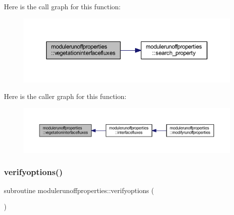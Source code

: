 Here is the call graph for this function\+:\nopagebreak
\begin{figure}[H]
\begin{center}
\leavevmode
\includegraphics[width=350pt]{namespacemodulerunoffproperties_ab3ab37be90febb6cff96da7ee7284955_cgraph}
\end{center}
\end{figure}
Here is the caller graph for this function\+:\nopagebreak
\begin{figure}[H]
\begin{center}
\leavevmode
\includegraphics[width=350pt]{namespacemodulerunoffproperties_ab3ab37be90febb6cff96da7ee7284955_icgraph}
\end{center}
\end{figure}
\mbox{\label{namespacemodulerunoffproperties_ab4947f5542eb22fb14b5660d0cac5ff1}} 
\subsubsection{\texorpdfstring{verifyoptions()}{verifyoptions()}}
{\footnotesize\ttfamily subroutine modulerunoffproperties\+::verifyoptions (\begin{DoxyParamCaption}{ }\end{DoxyParamCaption})\hspace{0.3cm}{\ttfamily [private]}}

\mbox{\label{namespacemodulerunoffproperties_a1a87c5174a0925e3408e5da2941a3e01}} 
